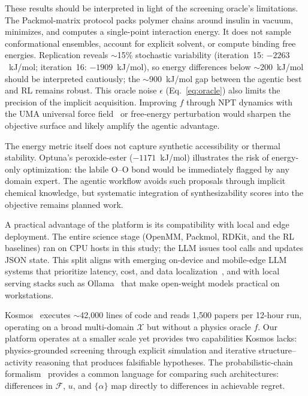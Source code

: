\documentclass[twocolumn]{fairmeta}
\begin{document}
These results should be interpreted in light of the screening oracle's limitations.
The Packmol-matrix protocol packs polymer chains around insulin in vacuum, minimizes, and computes a single-point interaction energy.
It does not sample conformational ensembles, account for explicit solvent, or compute binding free energies.
Replication reveals ${\sim}$15\% stochastic variability (iteration~15: $-2263$~kJ/mol; iteration~16: $-1909$~kJ/mol), so energy differences below ${\sim}$200~kJ/mol should be interpreted cautiously; the ${\sim}$900~kJ/mol gap between the agentic best and RL remains robust.
This oracle noise $\epsilon$ (Eq.~\ref{eq:oracle}) also limits the precision of the implicit acquisition.
Improving $f$ through NPT dynamics with the UMA universal force field~\cite{wood2025uma} or free-energy perturbation would sharpen the objective surface and likely amplify the agentic advantage.

The energy metric itself does not capture synthetic accessibility or thermal stability.
Optuna's peroxide-ester ($-1171$~kJ/mol) illustrates the risk of energy-only optimization: the labile O--O bond would be immediately flagged by any domain expert.
The agentic workflow avoids such proposals through implicit chemical knowledge, but systematic integration of synthesizability scores into the objective remains planned work.

A practical advantage of the platform is its compatibility with local and edge deployment.
The entire science stage (OpenMM, Packmol, RDKit, and the RL baselines) ran on CPU hosts in this study; the LLM issues tool calls and updates JSON state.
This split aligns with emerging on-device and mobile-edge LLM systems that prioritize latency, cost, and data localization~\cite{xu2024ondevice,qu2024mobileedge}, and with local serving stacks such as Ollama~\cite{ollama2023} that make open-weight models practical on workstations.

Kosmos~\cite{kosmos2025} executes ${\sim}$42,000 lines of code and reads 1,500 papers per 12-hour run, operating on a broad multi-domain $\mathcal{X}$ but without a physics oracle $f$.
Our platform operates at a smaller scale yet provides two capabilities Kosmos lacks: physics-grounded screening through explicit simulation and iterative structure--activity reasoning that produces falsifiable hypotheses.
The probabilistic-chain formalism~\cite{stephens2025mathframing} provides a common language for comparing such architectures: differences in $\mathcal{F}$, $u$, and $\{\alpha\}$ map directly to differences in achievable regret.
\end{document}
